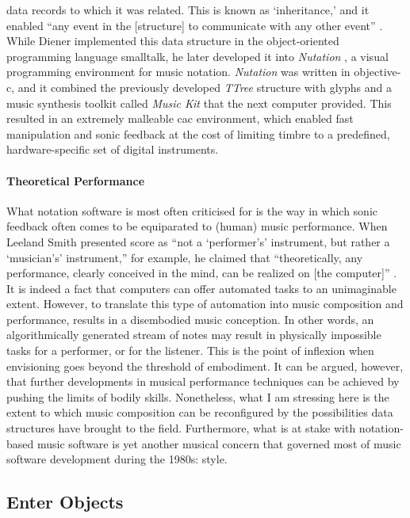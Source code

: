 \documentclass[
]{book}
\begin{document}
data records to which it was related. This is known as `inheritance,' and it enabled ``any event in the [structure] to communicate with any other event'' \parencite[188]{icmc/bbp2372.1988.020}. While Diener implemented this data structure in the object-oriented programming language \gls{smalltalk}, he later developed it into \textit{Nutation} \parencite{DBLP:conf/icmc/Diener92}, a visual programming environment for music notation. \textit{Nutation} was written in \gls{objective-c}, and it combined the previously developed \textit{TTree} structure with glyphs and a music synthesis toolkit called \textit{Music Kit} that the \gls{next} computer provided. This resulted in an extremely malleable \gls{cac} environment, which enabled fast manipulation and sonic feedback at the cost of limiting timbre to a predefined, hardware-specific set of digital instruments. 

\paragraph{Theoretical Performance}
What notation software is most often criticised for is the way in which sonic feedback often comes to be equiparated to (human) music performance. When Leeland Smith presented \gls{score} as ``not a `performer's' instrument, but rather a `musician's' instrument,'' for example, he claimed that ``theoretically, any performance, clearly conceived in the mind, can be realized on [the computer]'' \parencite[14]{smith1971}. It is indeed a fact that computers can offer automated tasks to an unimaginable extent. However, to translate this type of automation into music composition and performance, results in a disembodied music conception. In other words, an algorithmically generated stream of notes may result in physically impossible tasks for a performer, or for the listener. This is the point of inflexion when envisioning goes beyond the threshold of embodiment. It can be argued, however, that further developments in musical performance techniques can be achieved by pushing the limits of bodily skills. Nonetheless, what I am stressing here is the extent to which music composition can be reconfigured by the possibilities data structures have brought to the field. Furthermore, what is at stake with notation-based music software is yet another musical concern that governed most of music software development during the 1980s: style.

\subsection{Enter Objects}
\end{document}
